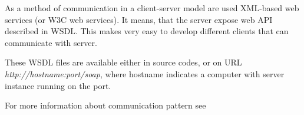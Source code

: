 
As a method of communication in a client-server model are used XML-based web services
(or W3C web services). It means, that the server expose web API described in WSDL.
This makes very easy to develop different clients that can communicate with
\textan{} server.

These WSDL files are available either in source codes, or on URL \emph{http://hostname:port/soap},
where hostname indicates a computer with \textan{} server instance running on the port.

For more information about communication pattern see 
